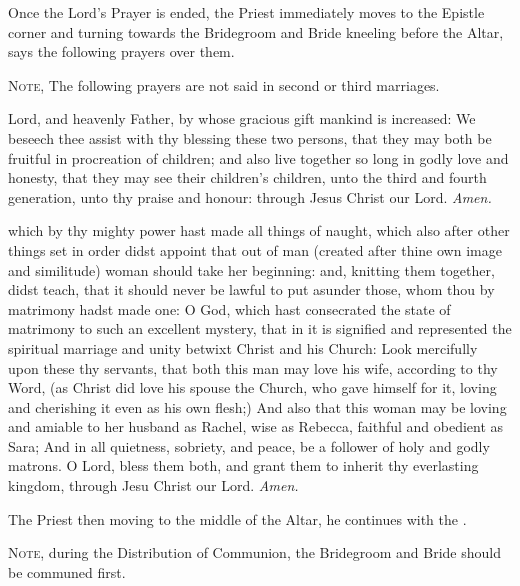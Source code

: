 \clearpage
\begin{rubric}
    Once the Lord's Prayer is ended, the Priest immediately moves to the Epistle corner and turning towards the Bridegroom and Bride kneeling before the Altar, says the following prayers over them.
\end{rubric}
\begin{rubric}
	\textsc{Note,} The following prayers are not said in second or third marriages.
\end{rubric}
 Lord, and heavenly Father, by whose gracious gift mankind is increased: We beseech thee assist with thy blessing these two persons, that they may both be fruitful in procreation of children; and also live together so long in godly love and honesty, that they may see their children's children, unto the third and fourth generation, unto thy praise and honour: through Jesus Christ our Lord. \textit{Amen.}\par
{} which by thy mighty power hast made all things of naught, which also after other things set in order didst appoint that out of man (created after thine own image and similitude) woman should take her beginning: and, knitting them together, didst teach, that it should never be lawful to put asunder those, whom thou by matrimony hadst made one: O God, which hast consecrated the state of matrimony to such an excellent mystery, that in it is signified and represented the spiritual marriage and unity betwixt Christ and his Church: Look mercifully upon these thy servants, that both this man may love his wife, according to thy Word, (as Christ did love his spouse the Church, who gave himself for it, loving and cherishing it even as his own flesh;) And also that this woman may be loving and amiable to her husband as Rachel, wise as Rebecca, faithful and obedient as Sara; And in all quietness, sobriety, and peace, be a follower of holy and godly matrons. O Lord, bless them both, and grant them to inherit thy everlasting kingdom, through Jesu Christ our Lord. \textit{Amen.}

\begin{rubric}
    The Priest then moving to the middle of the Altar, he continues with the .\par
    \textsc{Note,} during the Distribution of Communion, the Bridegroom and Bride should be communed first.
\end{rubric}


